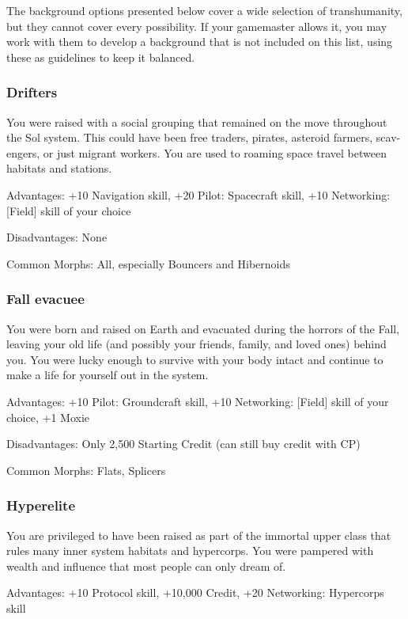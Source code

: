 The background options presented below cover a wide selection of transhumanity, but they cannot cover every possibility. If your gamemaster allows it, you may work with them to develop a background that is not included on this list, using these as guidelines to keep it balanced. 

\subsubsection{Drifters} \label{sec:drifters} 

You were raised with a social grouping that remained on the move throughout the Sol system. This could have been free traders, pirates, asteroid farmers, scav- engers, or just migrant workers. You are used to roaming space travel between habitats and stations. 

Advantages: +10 Navigation skill, +20 Pilot: Spacecraft skill, +10 Networking: [Field] skill of your choice 

Disadvantages: None 

Common Morphs: All, especially Bouncers and Hibernoids 

\subsubsection{Fall evacuee} \label{sec:fall-evacuee} 

You were born and raised on Earth and evacuated during the horrors of the Fall, leaving your old life (and possibly your friends, family, and loved ones) behind you. You were lucky enough to survive with your body intact and continue to make a life for yourself out in the system. 

Advantages: +10 Pilot: Groundcraft skill, +10 Networking: [Field] skill of your choice, +1 Moxie 

Disadvantages: Only 2,500 Starting Credit (can still buy credit with CP) 

Common Morphs: Flats, Splicers 

\subsubsection{Hyperelite} \label{sec:hyperelite} 

You are privileged to have been raised as part of the immortal upper class that rules many inner system habitats and hypercorps. You were pampered with wealth and influence that most people can only dream of. 

Advantages: +10 Protocol skill, +10,000 Credit, +20 Networking: Hypercorps skill 

